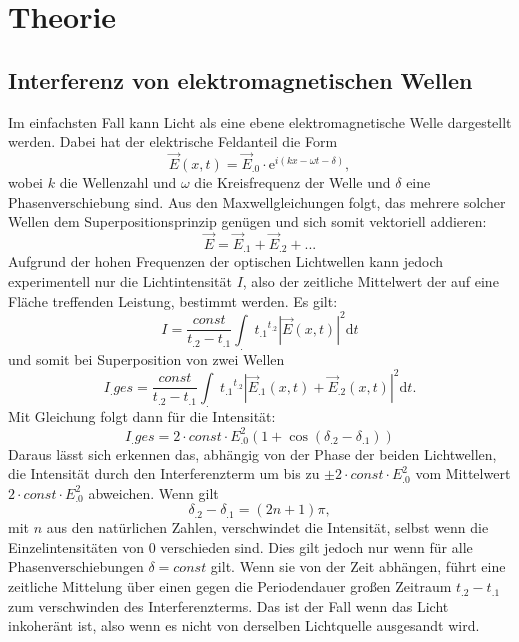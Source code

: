 \section{Theorie}
\label{sec:Theorie}

\subsection{Interferenz von elektromagnetischen Wellen}
Im einfachsten Fall kann Licht als eine ebene elektromagnetische Welle dargestellt werden. Dabei hat der elektrische Feldanteil die Form
\begin{equation}
\vec{E}(x,t)=\vec{E}_.0\cdot \mathrm{e}^{i\left(kx -\omega t -\delta\right)}\label{eq:Welle},
\end{equation}
wobei $k$ die Wellenzahl und $\omega$ die Kreisfrequenz der Welle und $\delta$ eine Phasenverschiebung sind.
Aus den Maxwellgleichungen folgt, das mehrere solcher Wellen dem Superpositionsprinzip genügen und sich somit vektoriell addieren:
\[
\vec{E}=\vec{E}_.1+\vec{E}_.2+\text{...}
\]
Aufgrund der hohen Frequenzen der optischen Lichtwellen kann jedoch experimentell nur die Lichtintensität $I$, also der zeitliche Mittelwert der auf eine Fläche treffenden Leistung, bestimmt werden.
Es gilt:
\[
I=\frac{const}{t_.2-t_.1}\int_.{t_.1}^{t_.2}|\vec{E}(x,t)|^2\mathrm{d}t
\]
und somit bei Superposition von zwei Wellen
\begin{equation}
I_.{ges}=\frac{const}{t_.2-t_.1}\int_.{t_.1}^{t_.2}|\vec{E}_.1(x,t)+\vec{E}_.2(x,t)|^2\mathrm{d}t \text{.}
\end{equation}
Mit Gleichung folgt dann für die Intensität:
\begin{equation}
I_.{ges}=2\cdot const\cdot E^2_.0(1+\cos(\delta_.2-\delta_.1))
\end{equation}
Daraus lässt sich erkennen das, abhängig von der Phase der beiden Lichtwellen, die Intensität durch den Interferenzterm um bis zu $\pm 2\cdot const\cdot E^2_.0$ vom Mittelwert $2\cdot const\cdot E^2_.0$ abweichen.
Wenn gilt
\[
\delta_.2-\delta_.1=(2n+1)\pi,
\]
mit $n$ aus den natürlichen Zahlen, verschwindet die Intensität, selbst wenn die Einzelintensitäten von $0$ verschieden sind.
Dies gilt jedoch nur wenn für alle Phasenverschiebungen $\delta=const$ gilt. Wenn sie von der Zeit abhängen, führt eine zeitliche Mittelung über einen gegen die Periodendauer großen Zeitraum $t_.2-t_.1$ zum verschwinden des Interferenzterms. Das ist der Fall wenn das Licht inkoheränt ist, also wenn es nicht von derselben Lichtquelle ausgesandt wird.\newline
